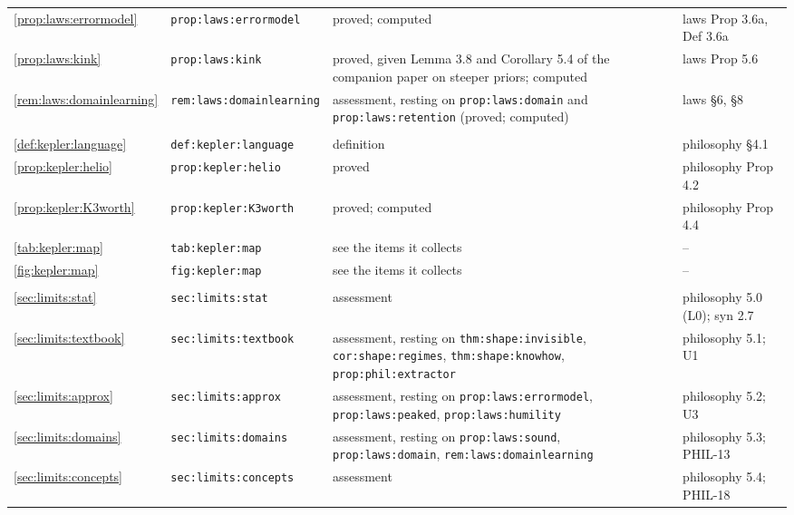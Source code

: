{\begin{longtable}{@{}>{\raggedright\arraybackslash}p{}>{\raggedright\arraybackslash}p{}>{\raggedright\arraybackslash}p{}>{\raggedright\arraybackslash}p{}@{}}
\cref{prop:laws:errormodel} & \texttt{prop:\allowbreak laws:\allowbreak errormodel} & proved; computed & laws Prop 3.6a, Def 3.6a\\
\cref{prop:laws:kink} & \texttt{prop:\allowbreak laws:\allowbreak kink} & proved, given Lemma 3.8 and Corollary 5.4 of the companion paper on steeper priors; computed & laws Prop 5.6\\
\cref{rem:laws:domainlearning} & \texttt{rem:\allowbreak laws:\allowbreak domainlearning} & assessment, resting on \texttt{prop:laws:domain} and \texttt{prop:laws:retention} (proved; computed) & laws \S6, \S8\\
\midrule
\multicolumn{4}{@{}l}{\texttt{kepler.tex}}\\
\cref{def:kepler:language} & \texttt{def:\allowbreak kepler:\allowbreak language} & definition & philosophy \S4.1\\
\cref{prop:kepler:helio} & \texttt{prop:\allowbreak kepler:\allowbreak helio} & proved & philosophy Prop 4.2\\
\cref{prop:kepler:K3worth} & \texttt{prop:\allowbreak kepler:\allowbreak K3worth} & proved; computed & philosophy Prop 4.4\\
\cref{tab:kepler:map} & \texttt{tab:\allowbreak kepler:\allowbreak map} & see the items it collects & --\\
\cref{fig:kepler:map} & \texttt{fig:\allowbreak kepler:\allowbreak map} & see the items it collects & --\\
\midrule
\multicolumn{4}{@{}l}{\texttt{limits.tex}}\\
\cref{sec:limits:stat} & \texttt{sec:\allowbreak limits:\allowbreak stat} & assessment & philosophy 5.0 (L0); syn 2.7\\
\cref{sec:limits:textbook} & \texttt{sec:\allowbreak limits:\allowbreak textbook} & assessment, resting on \texttt{thm:shape:invisible}, \texttt{cor:shape:regimes}, \texttt{thm:shape:knowhow}, \texttt{prop:phil:extractor} & philosophy 5.1; U1\\
\cref{sec:limits:approx} & \texttt{sec:\allowbreak limits:\allowbreak approx} & assessment, resting on \texttt{prop:laws:errormodel}, \texttt{prop:laws:peaked}, \texttt{prop:laws:humility} & philosophy 5.2; U3\\
\cref{sec:limits:domains} & \texttt{sec:\allowbreak limits:\allowbreak domains} & assessment, resting on \texttt{prop:laws:sound}, \texttt{prop:laws:domain}, \texttt{rem:laws:domainlearning} & philosophy 5.3; PHIL-13\\
\cref{sec:limits:concepts} & \texttt{sec:\allowbreak limits:\allowbreak concepts} & assessment & philosophy 5.4; PHIL-18\\

\end{longtable}}

